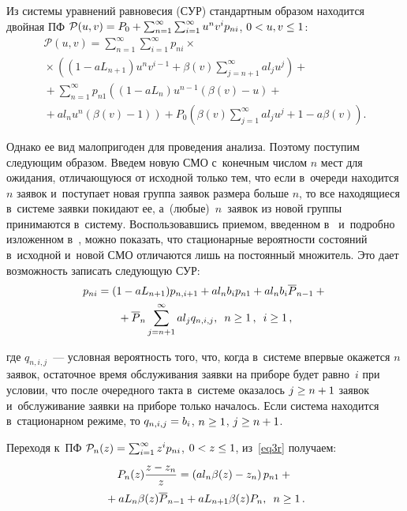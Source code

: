 \begin{multicols}{2}
Из системы уравнений равновесия (СУР) стандартным образом находится
двойная ПФ $\mathcal{P}(u,v)\hm=P_0+\sum\nolimits_{n=1}^\infty 
\sum\nolimits_{i=1}^\infty u^n v^i p_{ni}$,
$0\hm<u,v\hm\le 1$:
\begin{multline*}
\mathcal{P}(u,v)=
\sum\limits_{n=1}^\infty \sum\limits_{i=1}^\infty p_{ni}\times{}\\
{}\times
\left( (1-aL_{n+1}) u^n v^{i-1} + \beta(v) \sum\limits_{j=n+1}^\infty a 
l_j u^j \right)+{}\\
{}+\sum\limits_{n=1}^\infty p_{n1}
\left( (1-aL_{n}) u^{n-1} \left(\beta(v)-u \right) +{}\right.\\
\!\!\left.{}+ a l_n u^n (\beta(v)\!-\!1) \right)+
P_0\! \left(\!\beta(v) \sum\limits_{j=1}^\infty a l_j u^j+\!1\!-a \beta(v)\!\!\right)\!\!.\!\!
\end{multline*}

\noindent 
Однако ее вид малопригоден для проведения анализа.
Поэтому поступим следующим образом.
Введем новую СМО с~конечным числом $n$ мест для ожидания,
отличающуюся от исходной только тем, что
если в~очереди находится $n$ заявок и~поступает
новая группа заявок размера больше $n$,
то все находящиеся в~системе заявки покидают ее,
а~(любые)~$n$~заявок из новой группы принимаются в~систему.
Воспользовавшись приемом, введенном в~\cite{n4} и~подробно изложенном 
в~\cite{distime},
можно показать, что стационарные вероятности состояний в~исходной и~новой 
СМО
отличаются лишь на постоянный множитель.
Это дает возможность записать следующую СУР:
\begin{multline}
\label{eq3r}
p_{ni}=(1-aL_{n+1})
p_{n,i+1}
+a l_n b_i p_{n1}
+a l_n b_i
{\overline P}_{n-1}+{}\\
{}+ {\overline P}_n
\sum\limits_{j=n+1}^{\infty} a l_j q_{n,i,j},
\enskip n \ge 1\,, \enskip i \ge 1\,,
\end{multline}

\noindent  
где $q_{n,i,j}$~--- условная вероятность того, что, когда в~системе 
впервые
окажется $n$ заявок, остаточное время обслуживания заявки
на приборе будет равно~$i$ при условии, что
после очередного такта в~сис\-те\-ме оказалось $j \hm\ge n\hm+1$ заявок
и~обслуживание заявки на приборе только началось.
Если система находится в~стационарном режиме, то $q_{n,i,j}\hm=b_i$,
$n\hm\ge 1$, $j \hm\ge n\hm+1$.

Переходя к~ПФ $\mathcal{P}_n(z)\hm=\sum\nolimits_{i=1}^\infty z^i 
p_{ni}$, $0 \hm< z \hm\le 1$,
из~\eqref{eq3r} получаем:
\begin{multline}
\label{eq5}
P_n(z) \displaystyle\frac{\displaystyle z - z_n \mathstrut}{\displaystyle z\mathstrut}=
\left(a l_n \beta(z) - z_n \right) p_{n1}+{}\\
{}+a L_n \beta(z) {\overline P}_{n-1}
+a L_{n+1} \beta(z) P_n, \enskip n \ge 1\,.
\end{multline}


\end{multicols}
